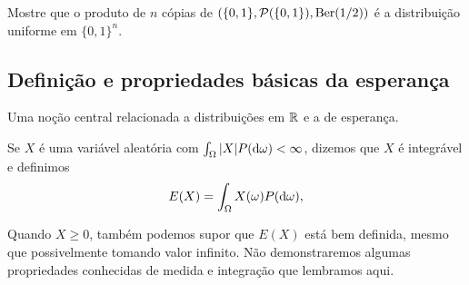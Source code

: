 \begin{exercise}
  Mostre que o produto de $n$ cópias de $(\{0,1\}, \mathcal{P}(\{0,1\}), \operatorname{Ber}(1/2))$ é a distribuição uniforme em $\{0,1\}^n$.
\end{exercise}


\subsection{Definição e propriedades básicas da esperança}

Uma noção central relacionada a distribuições em ${\mathbb R}$ e a de esperança.

\begin{definition}
  Se $X$ é uma variável aleatória com $\int_\Omega |X| P(\mathop{}\!\mathrm{d} \omega) < \infty$, dizemos que $X$ é integrável  e definimos
  \begin{equation}
    E(X) = \int_\Omega X(\omega) P(\mathop{}\!\mathrm{d} \omega),
  \end{equation}
\end{definition}

Quando $X \geq 0$, também podemos supor que $E(X)$ está bem definida, mesmo que possivelmente tomando valor infinito.
Não demonstraremos algumas propriedades conhecidas de medida e integração que lembramos aqui.

